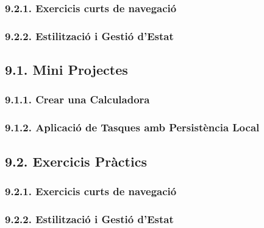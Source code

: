 \documentclass[12pt]{beamer}
\begin{document}
	\subsubsection{9.2.1. Exercicis curts de navegació}
	\subsubsection{9.2.2. Estilització i Gestió d'Estat}
	
	
	\subsection{9.1. Mini Projectes}
	\subsubsection{9.1.1. Crear una Calculadora}
	\subsubsection{9.1.2. Aplicació de Tasques amb Persistència Local}
	
	\subsection{9.2. Exercicis Pràctics}
	\subsubsection{9.2.1. Exercicis curts de navegació}
	\subsubsection{9.2.2. Estilització i Gestió d'Estat}
	
\end{document}
